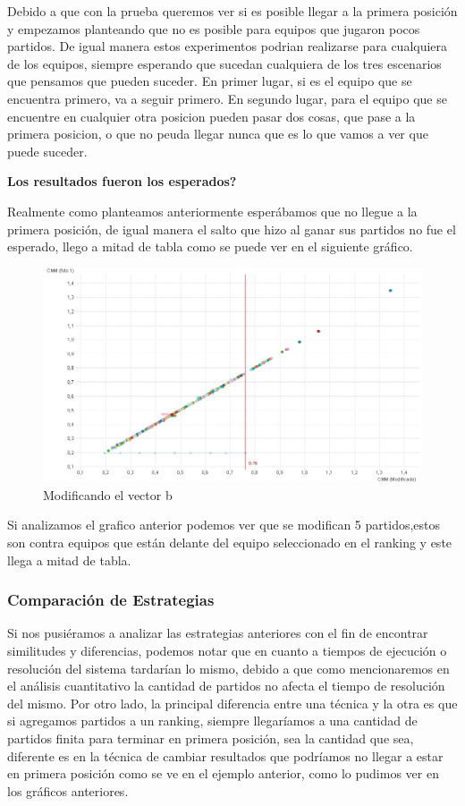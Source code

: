 Debido a que con la prueba queremos ver si es posible llegar a la primera posición y  empezamos planteando que no es posible para equipos que jugaron pocos partidos.
De igual manera estos experimentos podrian realizarse para cualquiera de los equipos, siempre esperando que sucedan cualquiera de los tres escenarios que pensamos que pueden suceder. En primer lugar, si es el equipo que se encuentra primero, va a seguir primero. En segundo lugar, para el equipo que se encuentre en cualquier otra posicion pueden pasar dos cosas, que pase a la primera posicion, o que no peuda llegar nunca que es lo que vamos a ver que puede suceder.

\textbf{Los resultados fueron los esperados?}

Realmente como planteamos anteriormente esperábamos que no llegue a la primera posición, de igual manera el salto que hizo al ganar sus partidos no fue el esperado, llego a mitad de tabla como se puede ver en el siguiente gráfico.

\begin{figure}[H]
    \centering
    \includegraphics[width=1\textwidth]{IMG/modificandob.jpg}
    \caption{Modificando el vector b}
    \label{fig:Modificando partidos perdidos}
\end{figure}

Si analizamos el grafico anterior podemos ver que se modifican 5 partidos,estos son contra equipos que están delante del equipo seleccionado en el ranking y este llega a mitad de tabla.

\subsubsection{Comparación de Estrategias}
Si nos pusiéramos a analizar las estrategias anteriores con el fin de encontrar similitudes y diferencias, podemos notar que en cuanto a tiempos de ejecución o resolución del sistema tardarían lo mismo, debido a que como mencionaremos en el análisis cuantitativo la cantidad de partidos no afecta el tiempo de resolución del mismo.
Por otro lado, la principal diferencia entre una técnica y la otra es que si agregamos partidos a un ranking, siempre llegaríamos a una cantidad de partidos finita para terminar en primera posición, sea la cantidad que sea, diferente es en la técnica de cambiar resultados que podríamos no llegar a estar en primera posición como se ve en el ejemplo anterior, como lo pudimos ver en los gráficos anteriores.

